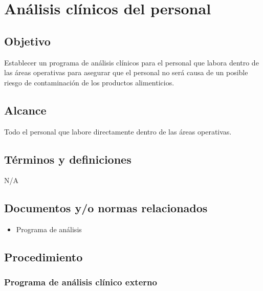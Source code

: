 \renewcommand{\MayorVer}{2}
\renewcommand{\MenorVer}{1}
\renewcommand{\Codigo}{BPD-7-POL}
\renewcommand{\FechaPub}{2023--01}
\renewcommand{\Titulo}{Análisis clínicos del personal}
\section{\Titulo}

\subsection{Objetivo}

Establecer un programa de análisis clínicos para el personal que labora dentro de las áreas operativas para asegurar que el personal no será causa de un posible riesgo de contaminación de los productos alimenticios.

\subsection{Alcance}

Todo el personal que labore directamente dentro de las áreas operativas.

\subsection{Términos y definiciones}

N/A

\subsection{Documentos y/o normas relacionados}

\begin{itemize}
	\item Programa de análisis
\end{itemize}

\subsection{Procedimiento}

\subsubsection{Programa de análisis clínico externo}

